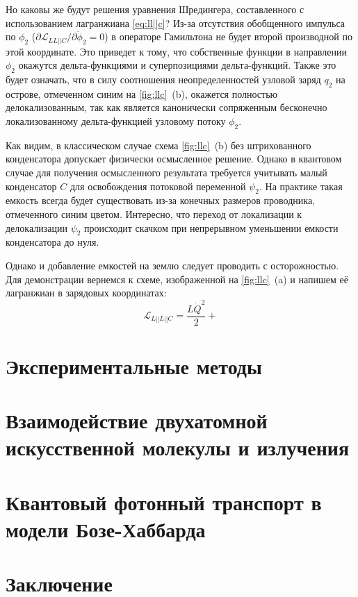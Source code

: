 \documentclass[14pt, a4paper]{extreport}
\renewcommand*\thesection{\arabic{section}}
\numberwithin{equation}{section}
\renewcommand*\thesection{\arabic{chapter}.\arabic{section}}
\begin{document}
Но каковы же будут решения уравнения Шредингера, составленного с использованием лагранжиана \eqref{eq:ll||c}? Из-за отсутствия обобщенного импульса по $\phi_2$ ($\partial \mathcal{L}_{LL||C}/\partial \dot \phi_2 = 0$) в операторе Гамильтона не будет второй производной по этой координате. Это приведет к тому, что собственные функции в направлении $\phi_2$ окажутся дельта-функциями и суперпозициями дельта-функций. Также это будет означать, что в силу соотношения неопределенностей узловой заряд $q_2$ на острове, отмеченном синим на \autoref{fig:llc}~(b), окажется полностью делокализованным, так как является канонически сопряженным бесконечно локализованному дельта-функцией узловому потоку $\phi_2$. 

Как видим, в классическом случае схема \autoref{fig:llc}~(b) без штрихованного конденсатора допускает физически осмысленное решение. Однако в квантовом случае для получения осмысленного результата требуется учитывать малый конденсатор $C$ для освобождения потоковой переменной $\psi_2$. На практике такая емкость всегда будет существовать из-за конечных размеров проводника, отмеченного синим цветом. Интересно, что переход от локализации к делокализации $\psi_2$ происходит скачком при непрерывном уменьшении емкости конденсатора до нуля.

Однако и добавление емкостей на землю следует проводить с осторожностью. Для демонстрации вернемся к схеме, изображенной на \autoref{fig:llc}~(a) и напишем её лагранжиан в зарядовых координатах:
\begin{equation}
	\mathcal L_{L||L||C} = \frac{L\dot Q^2}{2} + 
\end{equation}


\chapter{Экспериментальные методы}

\chapter{Взаимодействие двухатомной искусственной молекулы и излучения}

\chapter{Квантовый фотонный транспорт в модели Бозе-Хаббарда}

\chapter{Заключение}


\appendix
\renewcommand*\thesection{\Alph{chapter}.\arabic{section}}


\renewcommand\bibname{Список литературы}


\end{document}

